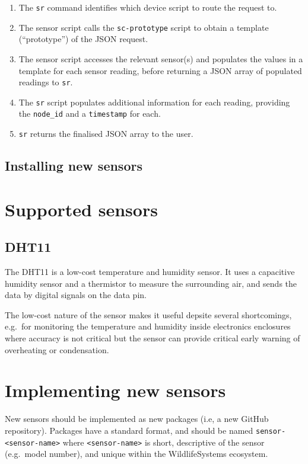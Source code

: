 \documentclass[
]{book}
\begin{document}
\begin{enumerate}
\def\labelenumi{\arabic{enumi}.}
\item
  The \texttt{sr} command identifies which device script to route the request to.
\item
  The sensor script calls the \texttt{sc-prototype} script to obtain a template (``prototype'') of the JSON request.
\item
  The sensor script accesses the relevant sensor(s) and populates the values in a template for each sensor reading, before returning a JSON array of populated readings to \texttt{sr}.
\item
  The \texttt{sr} script populates additional information for each reading, providing the \texttt{node\_id} and a \texttt{timestamp} for each.
\item
  \texttt{sr} returns the finalised JSON array to the user.
\end{enumerate}

\section{Installing new sensors}\label{installing-new-sensors}

\chapter{Supported sensors}\label{supported-sensors}

\section{DHT11}\label{dht11}

The DHT11 is a low-cost temperature and humidity sensor. It uses a capacitive humidity sensor and a thermistor to measure the surrounding air, and sends the data by digital signals on the data pin.

The low-cost nature of the sensor makes it useful depsite several shortcomings, e.g.~for monitoring the temperature and humidity inside electronics enclosures where accuracy is not critical but the sensor can provide critical early warning of overheating or condensation.

\chapter{Implementing new sensors}\label{implementing-new-sensors}

New sensors should be implemented as new packages (i.e, a new GitHub repository). Packages have a standard format, and should be named \texttt{sensor-\textless{}sensor-name\textgreater{}} where \texttt{\textless{}sensor-name\textgreater{}} is short, descriptive of the sensor (e.g.~model number), and unique within the WildlifeSystems ecosystem.
\end{document}
